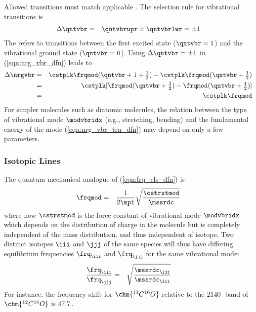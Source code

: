 \documentclass[12pt]{article}
\begin{document}
Allowed transitions must match applicable .
The selection rule for vibrational transitions is
\begin{eqnarray}
\Delta \qntvbr & = & \qntvbrupr \pm \qntvbrlwr = \pm 1
\label{eqn:slc_vbr_dfn}
\end{eqnarray}
The  refers to transitions between the
first excited state ($\qntvbr = 1$) and the vibrational ground state
($\qntvbr = 0$).
Using $\Delta \qntvbr = \pm 1$ in (\ref{eqn:nrg_vbr_dfn}) leads to
\begin{eqnarray}
\Delta \nrgvbr & = & 
\cstplk \frqmod (\qntvbr + 1 + {\textstyle\frac{1}{2}})
- \cstplk \frqmod (\qntvbr + {\textstyle\frac{1}{2}}) \nonumber \\
& = & 
\cstplk [ \frqmod ( \qntvbr + {\textstyle\frac{3}{2}} ) 
- \frqmod (\qntvbr + {\textstyle\frac{1}{2}}) ] \nonumber \\
& = & \cstplk \frqmod
\label{eqn:nrg_vbr_trn_dfn}
\end{eqnarray}
For simpler molecules such as diatomic molecules, the relation between
the type of vibrational mode $\modvbridx$ (e.g., stretching, bending)
and the fundamental energy of the mode (\ref{eqn:nrg_vbr_trn_dfn}) may
depend on only a few parameters.

\subsubsection[Isotopic Lines]{Isotopic Lines}\label{sxn:iso_ln}

The quantum mechanical analogue of (\ref{eqn:frq_cls_dfn}) is
\begin{eqnarray}
\frqmod & = & \frac{1}{2\mpi}\sqrt{\frac{\cstrstmod}{\mssrdc}} 
\label{eqn:frq_qnt_dfn}
\end{eqnarray}
where now $\cstrstmod$ is the force constant of vibrational mode
$\modvbridx$ which depends on the distribution of charge in the molecule but
is completely independent of the mass distribution, and thus
independent of isotope. 
Two distinct isotopes $\iii$ and $\jjj$ of the same species
will thus have differing equilibrium frequencies $\frq_{\iii}$
and $\frq_{\jjj}$ for the same vibrational mode:
\begin{eqnarray}
\frac{\frq_{\iii}}{\frq_{\jjj}} & = & \sqrt{\frac{\mssrdc_{\jjj}}{\mssrdc_{\iii}}}
\label{eqn:frq_iso_dfn}
\end{eqnarray}
For instance, the frequency shift for $\chm{{}^{13}C{}^{16}O}$
relative to the 2140\,\xcm\ band of $\chm{{}^{12}C{}^{16}O}$ is
47.7\,\xcm. %
\end{document}
